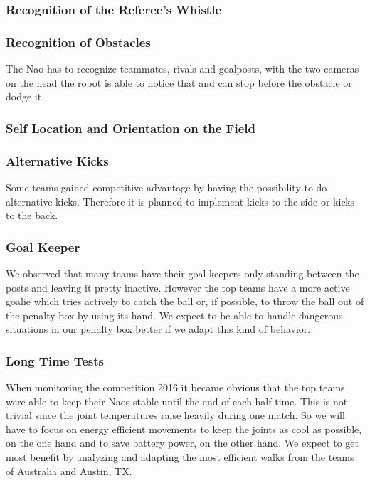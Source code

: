\documentclass[12pt]{article}
\theoremstyle{definition}
\newcommand{\unclear}[1]{\vspace{.5em}\parbox{.9\linewidth}{\color{red}{\bf Remark: #1}}\vspace{.5em}}
\begin{document}
\unclear{Please add some brief details to which messages from the game controller the Naos have to react}

\subsubsection{Recognition of the Referee's Whistle}

\subsubsection{Recognition of Obstacles}
\unclear{Do not know what you want to tell with this paragraph. Concentrate on the question Why? and How to solve?} 

The Nao has to recognize teammates, rivals and goalposts, with the two cameras on the head the robot is able to notice that and can stop before the obstacle or dodge it.

\subsubsection{Self Location and Orientation on the Field}

\subsubsection{Alternative Kicks}
Some teams gained competitive advantage by having the possibility to do alternative kicks. Therefore it is planned to implement kicks to the side or kicks to the back.

\subsubsection{Goal Keeper}
We observed that many teams have their goal keepers only standing between the posts and leaving it pretty inactive. However the top teams have a more active goalie which tries actively to catch the ball or, if possible, to throw the ball out of the penalty box by using its hand. We expect to be able to handle dangerous situations in our penalty box better if we adapt this kind of behavior.

\subsubsection{Long Time Tests}
When monitoring the competition 2016 it became obvious that the top teams were able to keep their Naos stable until the end of each half time. This is not trivial since the joint temperatures raise heavily during one match. So we will have to focus on energy efficient movements to keep the joints as cool as possible, on the one hand and to save battery power, on the other hand. We expect to get most benefit by analyzing and adapting the most efficient walks from the teams of Australia and Austin, TX.
 
\end{document}
